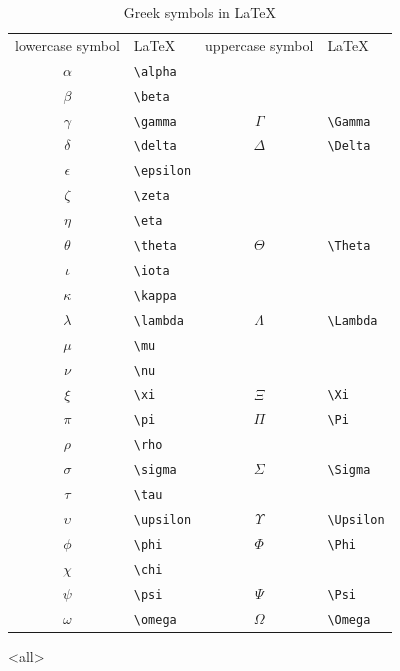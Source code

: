 \label{ch:greeksymbols}

\begin{table}[ht!]\centering\small
\caption{Greek symbols in \LaTeX}\label{tab:greeksymbols}
    \begin{tabular}{cl|cl}
        \toprule
        lowercase symbol	    &	\LaTeX  	     &	uppercase symbol	  &	 \LaTeX\\[+2ex]	
        $\alpha$	&	\verb|\alpha|	 &   &	\\
        $\beta$	    &	\verb|\beta|	 &   &	\\
        $\gamma$	&	\verb|\gamma|	 & $\Gamma$	&	\verb|\Gamma|	\\
        $\delta$	&	\verb|\delta|	 &  $\Delta$	&	\verb|\Delta|	\\
        $\epsilon$	&	\verb|\epsilon|	 &   &	\\
        $\zeta$	    &	\verb|\zeta|	 &   &	\\
        $\eta$	    &	\verb|\eta|	 &   &	\\
        $\theta$	&	\verb|\theta|	 &   $\Theta$	&	\verb|\Theta|	\\
        $\iota$	    &	\verb|\iota|	 &   &	\\
        $\kappa$	&	\verb|\kappa|	 &   &	\\
        $\lambda$	&	\verb|\lambda|	 &      $\Lambda$	&	\verb|\Lambda|	\\
        $\mu$	&	\verb|\mu|	 &   &	\\
        $\nu$	&	\verb|\nu|	 &   &	\\
        $\xi$	&	\verb|\xi|	 &    $\Xi$	&	\verb|\Xi|	\\
        $\pi$	&	\verb|\pi|	 &    $\Pi$	&	\verb|\Pi|	\\
        $\rho$	&	\verb|\rho|	 &   &	\\
        $\sigma$	&	\verb|\sigma|	 &   $\Sigma$	&	\verb|\Sigma|	\\
        $\tau$	&	\verb|\tau|	 &   &	\\
        $\upsilon$	&	\verb|\upsilon|	 &    $\Upsilon$	&	\verb|\Upsilon|	\\
        $\phi$	&	\verb|\phi|	 &   $\Phi$	&	\verb|\Phi|		\\
        $\chi$	&	\verb|\chi|	 &   &	\\
        $\psi$	&	\verb|\psi|	 &    $\Psi$	&	\verb|\Psi|		\\
        $\omega$	&	\verb|\omega|	 &    $\Omega$	&	\verb|\Omega|	\\
        \bottomrule
    \end{tabular}
\end{table}

\mode<all>